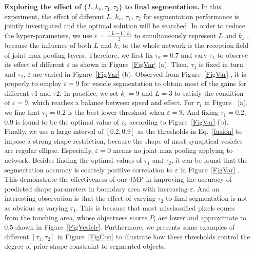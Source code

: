 \noindent\textbf{Exploring the effect of $\{L, k_s, \tau_1, \tau_2\}$ to final segmentation.}
In this experiment, the effect of different $L$, $k_s$, $\tau_1$, $\tau_2$ for segmentation performance is jointly investigated and the optimal solution will be searched.
In order to reduce the hyper-parameters, we use $\varepsilon=\frac{(L-1)k_s}{2}$ to simultaneously represent $L$ and $k_s$ , because the influence of both $L$ and $k_s$ to the whole network is the reception field of joint max pooling layers.
Therefore, we first fix $\tau_2=0.7$ and vary $\tau_1$ to observe its effect of different $\varepsilon$ as shown in Figure~\ref{FigVar} (a).
Then, $\tau_1$ is fixed in turn and $\tau_2$, $\varepsilon$ are varied in Figure~\ref{FigVar}  (b).
Observed from Figure~\ref{FigVar} , it is properly to employ $\varepsilon=9$ for vesicle segmentation to obtain most of the gains for different $\tau1$ and $\tau2$.
In practice, we set $k_s=9$ and $L=3$ to satisfy the condition of $\varepsilon=9$, which reaches a balance between speed and effect.
For $\tau_1$ in Figure~ (a), we fine that $\tau_1=0.2$ is the best lower threshold when $\varepsilon=9$.
And fixing $\tau_1=0.2$, $0.9$ is found to be the optimal value of $\tau_2$ according to Figure~\ref{FigVar} (b).
Finally, we use a large interval of $[0.2, 0.9]$ as the thresholds in Eq.~\ref{fusion} to impose a strong shape restriction, because the shape of most synaptical vesicles are regular ellipse.
Especially, $\varepsilon=0$ means no joint max pooling applying to network.
Besides finding the optimal values of $\tau_1$ and $\tau_2$, it can be found that the segmentation accuracy is coarsely positive correlation to $\varepsilon$ in  Figure~\ref{FigVar} .
This demonstrate the effectiveness of our JMP in improving the accuracy of predicted shape parameters in boundary area with increasing $\varepsilon$.
And an interesting observation is that the effect of varying $\tau_2$ to final segmentation is not as obvious as varying $\tau_1$.
This is because that most misclassified pixels comes from the touching area, whose objectness scores $P_i$ are lower and approximate to $0.5$ shown in Figure~\ref{FigVesicle}.
Furthermore, we presents some examples of different $[\tau_1,\tau_2]$ in Figure~\ref{FigCon} to illustrate how these thresholds control the degree of prior shape constraint to segmented objects.

